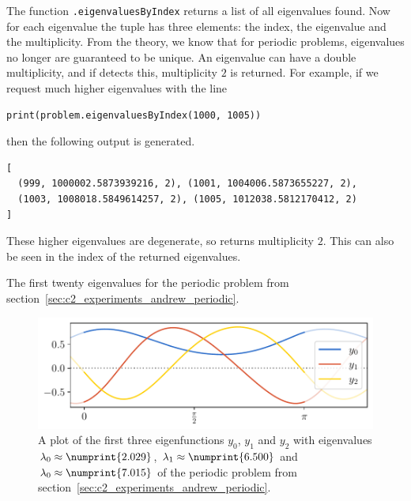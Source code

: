 The function \texttt{.eigenvaluesByIndex} returns a list of all eigenvalues found. Now for each eigenvalue the tuple has three elements: the index, the eigenvalue and the multiplicity. From the theory, we know that for periodic problems, eigenvalues no longer are guaranteed to be unique. An eigenvalue can have a double multiplicity, and if \pyslise{} detects this, multiplicity $2$ is returned. For example, if we request much higher eigenvalues with the line
\begin{verbatim}
print(problem.eigenvaluesByIndex(1000, 1005))
\end{verbatim}
then the following output is generated.
\begin{verbatim}
[
  (999, 1000002.5873939216, 2), (1001, 1004006.5873655227, 2),
  (1003, 1008018.5849614257, 2), (1005, 1012038.5812170412, 2)
]
\end{verbatim}
These higher eigenvalues are degenerate, so \pyslise{} returns multiplicity $2$. This can also be seen in the index of the returned eigenvalues.

\begin{table}
    \begin{center}
        
    \end{center}
    \caption{The first twenty eigenvalues for the periodic problem from section~\ref{sec:c2_experiments_andrew_periodic}.}\label{tab:c2_andrew_periodic}
\end{table}

\begin{figure}
    \begin{center}
        \includegraphics[width=1\textwidth]{img/chapter2/matslise_periodic_eigenfunctions.pdf}
    \end{center}
    \caption{A plot of the first three eigenfunctions $y_0$, $y_1$ and $y_2$ with eigenvalues $\lambda_0\approx\numprint{2.029}$, $\lambda_1\approx\numprint{6.500}$ and $\lambda_0\approx\numprint{7.015}$ of  the periodic problem from section~\ref{sec:c2_experiments_andrew_periodic}.}\label{fig:c2_periodic_eigenfunctions}
\end{figure}

